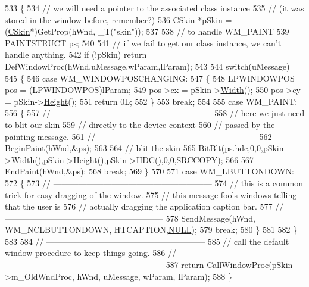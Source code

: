 \begin{DoxyCode}
533 \{
534   \textcolor{comment}{// we will need a pointer to the associated class instance}
535   \textcolor{comment}{// (it was stored in the window before, remember?)}
536   \mbox{\hyperlink{class_c_skin}{CSkin}} *pSkin = (\mbox{\hyperlink{class_c_skin}{CSkin}}*)GetProp(hWnd, \_T(\textcolor{stringliteral}{"skin"}));
537 
538   \textcolor{comment}{// to handle WM\_PAINT}
539   PAINTSTRUCT ps;
540 
541   \textcolor{comment}{// if we fail to get our class instance, we can't handle anything.}
542   \textcolor{keywordflow}{if} (!pSkin) \textcolor{keywordflow}{return} DefWindowProc(hWnd,uMessage,wParam,lParam);
543 
544   \textcolor{keywordflow}{switch}(uMessage)
545     \{
546     \textcolor{keywordflow}{case} WM\_WINDOWPOSCHANGING:
547       \{
548         LPWINDOWPOS pos = (LPWINDOWPOS)lParam;
549         pos->cx = pSkin->\mbox{\hyperlink{class_c_skin_ae819e05e0e07c194d24bc8cdf5daeb94}{Width}}();
550         pos->cy = pSkin->\mbox{\hyperlink{class_c_skin_a26de0d121ce1811feea27cc30f4c2f70}{Height}}();
551         \textcolor{keywordflow}{return} 0L;
552       \}
553       \textcolor{keywordflow}{break};
554 
555     \textcolor{keywordflow}{case} WM\_PAINT:
556       \{
557         \textcolor{comment}{// ---------------------------------------------------------}
558         \textcolor{comment}{// here we just need to blit our skin}
559         \textcolor{comment}{// directly to the device context}
560         \textcolor{comment}{// passed by the painting message.}
561         \textcolor{comment}{// ---------------------------------------------------------}
562         BeginPaint(hWnd,&ps);
563 
564         \textcolor{comment}{// blit the skin}
565         BitBlt(ps.hdc,0,0,pSkin->\mbox{\hyperlink{class_c_skin_ae819e05e0e07c194d24bc8cdf5daeb94}{Width}}(),pSkin->\mbox{\hyperlink{class_c_skin_a26de0d121ce1811feea27cc30f4c2f70}{Height}}(),pSkin->\mbox{\hyperlink{class_c_skin_a4112f4df38d9917d38c5db2622777c1f}{HDC}}(),0,0,SRCCOPY);
566 
567         EndPaint(hWnd,&ps);
568         \textcolor{keywordflow}{break};
569       \}
570 
571     \textcolor{keywordflow}{case} WM\_LBUTTONDOWN:
572       \{
573         \textcolor{comment}{// ---------------------------------------------------------}
574         \textcolor{comment}{// this is a common trick for easy dragging of the window.}
575         \textcolor{comment}{// this message fools windows telling that the user is}
576         \textcolor{comment}{// actually dragging the application caption bar.}
577         \textcolor{comment}{// ---------------------------------------------------------}
578         SendMessage(hWnd, WM\_NCLBUTTONDOWN, HTCAPTION,\mbox{\hyperlink{getopt1_8c_a070d2ce7b6bb7e5c05602aa8c308d0c4}{NULL}});
579         \textcolor{keywordflow}{break};
580       \}
581 
582     \}
583 
584   \textcolor{comment}{// ---------------------------------------------------------}
585   \textcolor{comment}{// call the default window procedure to keep things going.}
586   \textcolor{comment}{// ---------------------------------------------------------}
587   \textcolor{keywordflow}{return} CallWindowProc(pSkin->m\_OldWndProc, hWnd, uMessage, wParam, lParam);
588 \}
\end{DoxyCode}


